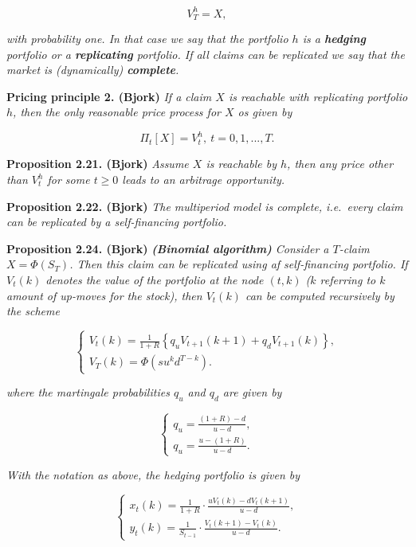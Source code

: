 \documentclass[
]{book}
\begin{document}
\[
V_T^h=X,
\]

\emph{with probability one. In that case we say that the portfolio \(h\) is a \textbf{hedging} portfolio or a \textbf{replicating} portfolio. If all claims can be replicated we say that the market is \emph{(dynamically)} \textbf{complete}.}

\textbf{Pricing principle 2. (Bjork)} \emph{If a claim \(X\) is reachable with replicating portfolio \(h\), then the only reasonable price process for \(X\) os given by}

\[
\Pi_t[X]=V_t^h,\ t=0,1,...,T.
\]

\textbf{Proposition 2.21. (Bjork)} \emph{Assume \(X\) is reachable by \(h\), then any price other than \(V_t^h\) for some \(t\ge 0\) leads to an arbitrage opportunity.}

\textbf{Proposition 2.22. (Bjork)} \emph{The multiperiod model is complete, i.e.~every claim can be replicated by a self-financing portfolio.}

\textbf{Proposition 2.24. (Bjork)} \emph{\textbf{(Binomial algorithm)} Consider a \(T\)-claim \(X=\Phi(S_T)\). Then this claim can be replicated using af self-financing portfolio. If \(V_t(k)\) denotes the value of the portfolio at the node \((t,k)\) (\(k\) referring to \(k\) amount of up-moves for the stock), then \(V_t(k)\) can be computed recursively by the scheme}

\[
\left\{\begin{matrix}V_t(k)=\frac{1}{1+R}\left\{q_uV_{t+1}(k+1)+q_dV_{t+1}(k)\right\},\\ V_T(k)=\Phi(su^kd^{T-k}).\end{matrix}\right.
\]

\emph{where the martingale probabilities \(q_u\) and \(q_d\) are given by}

\[
\left\{\begin{matrix}q_u=\frac{(1+R)-d}{u-d},\\ q_u=\frac{u-(1+R)}{u-d}.\end{matrix}\right.
\]

\emph{With the notation as above, the hedging portfolio is given by}

\[
\left\{\begin{matrix}x_t(k)=\frac{1}{1+R}\cdot\frac{uV_t(k)-dV_t(k+1)}{u-d},\\ y_t(k)=\frac{1}{S_{t-1}}\cdot\frac{V_t(k+1)-V_t(k)}{u-d}.\end{matrix}\right.
\]
\end{document}
